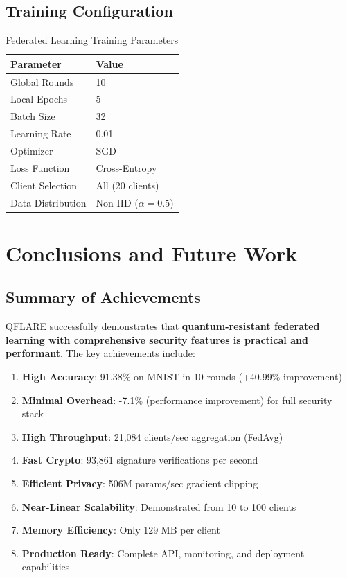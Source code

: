 \documentclass[12pt,a4paper]{article}
\begin{document}
\subsection{Training Configuration}

\begin{table}[H]
\centering
\caption{Federated Learning Training Parameters}
\begin{tabular}{ll}
\toprule
\textbf{Parameter} & \textbf{Value} \\
\midrule
Global Rounds & 10 \\
Local Epochs & 5 \\
Batch Size & 32 \\
Learning Rate & 0.01 \\
Optimizer & SGD \\
Loss Function & Cross-Entropy \\
Client Selection & All (20 clients) \\
Data Distribution & Non-IID ($\alpha=0.5$) \\
\bottomrule
\end{tabular}
\end{table}

\section{Conclusions and Future Work}

\subsection{Summary of Achievements}

QFLARE successfully demonstrates that \textbf{quantum-resistant federated learning with comprehensive security features is practical and performant}. The key achievements include:

\begin{enumerate}
    \item \textbf{High Accuracy}: 91.38\% on MNIST in 10 rounds (+40.99\% improvement)
    \item \textbf{Minimal Overhead}: -7.1\% (performance improvement) for full security stack
    \item \textbf{High Throughput}: 21,084 clients/sec aggregation (FedAvg)
    \item \textbf{Fast Crypto}: 93,861 signature verifications per second
    \item \textbf{Efficient Privacy}: 506M params/sec gradient clipping
    \item \textbf{Near-Linear Scalability}: Demonstrated from 10 to 100 clients
    \item \textbf{Memory Efficiency}: Only 129 MB per client
    \item \textbf{Production Ready}: Complete API, monitoring, and deployment capabilities
\end{enumerate}
\end{document}
